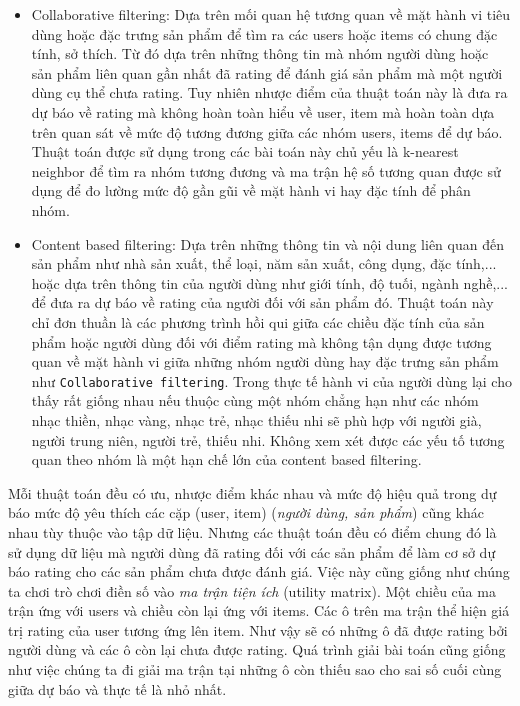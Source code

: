 \documentclass[11pt]{article}
\begin{document}
\begin{itemize}
\item
  Collaborative filtering: Dựa trên mối quan hệ tương quan về mặt hành
  vi tiêu dùng hoặc đặc trưng sản phẩm để tìm ra các users hoặc items có
  chung đặc tính, sở thích. Từ đó dựa trên những thông tin mà nhóm người
  dùng hoặc sản phẩm liên quan gần nhất đã rating để đánh giá sản phẩm
  mà một người dùng cụ thể chưa rating. Tuy nhiên nhược điểm của thuật
  toán này là đưa ra dự báo về rating mà không hoàn toàn hiểu về user,
  item mà hoàn toàn dựa trên quan sát về mức độ tương đương giữa các
  nhóm users, items để dự báo. Thuật toán được sử dụng trong các bài
  toán này chủ yếu là k-nearest neighbor để tìm ra nhóm tương đương và
  ma trận hệ số tương quan được sử dụng để đo lường mức độ gần gũi về
  mặt hành vi hay đặc tính để phân nhóm.
\item
  Content based filtering: Dựa trên những thông tin và nội dung liên
  quan đến sản phẩm như nhà sản xuất, thể loại, năm sản xuất, công dụng,
  đặc tính,... hoặc dựa trên thông tin của người dùng như giới tính, độ
  tuối, ngành nghề,... để đưa ra dự báo về rating của người đối với sản
  phẩm đó. Thuật toán này chỉ đơn thuần là các phương trình hồi qui giữa
  các chiều đặc tính của sản phẩm hoặc người dùng đối với điểm rating mà
  không tận dụng được tương quan về mặt hành vi giữa những nhóm người
  dùng hay đặc trưng sản phẩm như \texttt{Collaborative\ filtering}.
  Trong thực tế hành vi của người dùng lại cho thấy rất giống nhau nếu
  thuộc cùng một nhóm chẳng hạn như các nhóm nhạc thiền, nhạc vàng, nhạc
  trẻ, nhạc thiếu nhi sẽ phù hợp với người già, người trung niên, người
  trẻ, thiếu nhi. Không xem xét được các yếu tố tương quan theo nhóm là
  một hạn chế lớn của content based filtering.
\end{itemize}

Mỗi thuật toán đều có ưu, nhược điểm khác nhau và mức độ hiệu quả trong
dự báo mức độ yêu thích các cặp (user, item) (\emph{người dùng, sản
phẩm}) cũng khác nhau tùy thuộc vào tập dữ liệu. Nhưng các thuật toán
đều có điểm chung đó là sử dụng dữ liệu mà người dùng đã rating đối với
các sản phẩm để làm cơ sở dự báo rating cho các sản phẩm chưa được đánh
giá. Việc này cũng giống như chúng ta chơi trò chơi điền số vào \emph{ma
trận tiện ích} (utility matrix). Một chiều của ma trận ứng với users và
chiều còn lại ứng với items. Các ô trên ma trận thể hiện giá trị rating
của user tương ứng lên item. Như vậy sẽ có những ô đã được rating bởi
người dùng và các ô còn lại chưa được rating. Quá trình giải bài toán
cũng giống như việc chúng ta đi giải ma trận tại những ô còn thiếu sao
cho sai số cuối cùng giữa dự báo và thực tế là nhỏ nhất.
\end{document}
